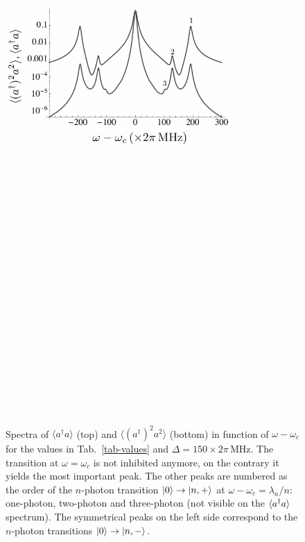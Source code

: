\begin{figure}
    \center
    \includegraphics[width=0.75 \textwidth]{Images/chap5/spectrum150.pdf}
    \caption[$\langle a^\dagger a \rangle$ and $\langle (a^\dagger)^2 a^2 \rangle$]{Spectra of $\langle a^\dagger a \rangle$ (top) and $\langle (a^\dagger)^2 a^2 \rangle$ (bottom) in function of  $\omega-\omega_c$ for the values in Tab.~\ref{tab-values} and $\Delta=150 \times 2\pi\,\mbox{MHz}$. The transition at $\omega=\omega_c$ is not inhibited anymore, on the contrary it yields the most important peak. The other peaks are numbered as the order of the $n$-photon transition $| 0 \rangle \rightarrow | n,+ \rangle$ at $\omega-\omega_c=\lambda_n/n$: one-photon, two-photon and three-photon (not visible on the $\langle a^\dagger a \rangle$ spectrum). The symmetrical peaks on the left side correspond to the $n$-photon transitions $| 0 \rangle \rightarrow | n,- \rangle$.}
    \label{fig-spec150}
\end{figure}

